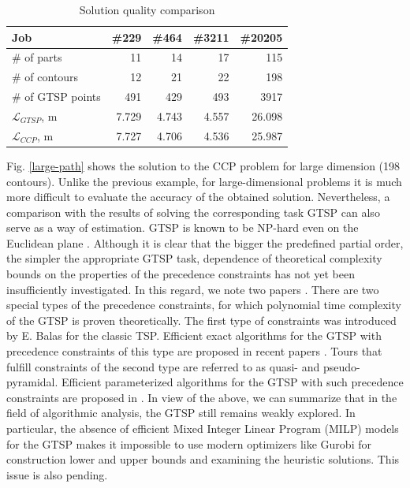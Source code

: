 \documentclass[]{llncs}
\begin{document}
\begin{table}[h]
  \begin{center}
  \begin{tabular}{l*{4}{|r}}
      Job & \#229 & \#464 & \#3211 & \#20205 \\
      \hline \hline
      \# of parts & 11 & 14 & 17 & 115 \\
      \hline
      \# of contours & 12 & 21 & 22 & 198 \\
      \hline
      \# of GTSP points & 491 & 429 & 493 & 3917 \\
      \hline
      $\mathcal L_{GTSP}$, m & 7.729 & 4.743 & 4.557 & 26.098 \\
      \hline
      $\mathcal L_{CCP}$, m & 7.727 & 4.706 & 4.536 & 25.987 \\
      \hline
  \end{tabular}
  \caption{Solution quality comparison}
  \label{ccp-vs-gtsp}
  \end{center}
\end{table}

Fig. \ref{large-path}
shows the solution to the CCP problem for large dimension
(198 contours).
Unlike the previous example,
for large-dimensional problems
it is much more difficult to evaluate
the accuracy of the obtained solution.
Nevertheless,
a comparison with the results of solving
the corresponding task GTSP
can also serve as a way of estimation.
GTSP is known to be NP-hard even on the Euclidean plane \cite{bib:x103}.
Although it is clear that
the bigger the predefined partial order,
the simpler the appropriate GTSP task,
dependence of theoretical complexity bounds
on the properties of the precedence constraints
has not yet been insufficiently investigated.
In this regard, we note two papers \cite{bib:x104,bib:x105}.
There are two special types of the precedence constraints,
for which polynomial time complexity of the GTSP is proven theoretically.
The first type of constraints was introduced by E. Balas \cite{bib:x100}
for the classic TSP.
Efficient exact algorithms for the GTSP with precedence constraints
of this type are proposed in recent papers
\cite{bib:x102,ChentsovIII}.
Tours that fulfill constraints of the second type
are referred to as quasi- and pseudo-pyramidal.
Efficient parameterized algorithms for the GTSP
with such precedence constraints are proposed in \cite{KhachaiI,KhachayII}.
In view of the above,
we can summarize that in the field of algorithmic analysis,
the GTSP still remains weakly explored.
In particular,
the absence of efficient Mixed Integer Linear Program (MILP)
models for the GTSP makes it impossible to use modern optimizers like Gurobi \cite{bib:x101}
for construction lower and upper bounds and examining the heuristic solutions.
This issue is also pending.
\end{document}
